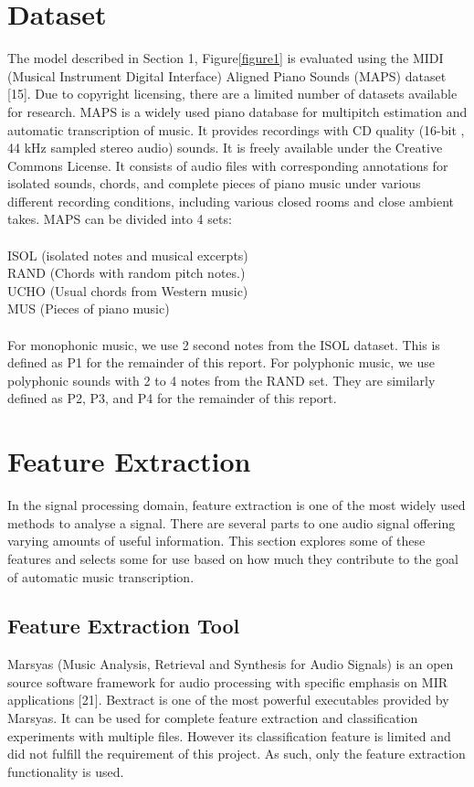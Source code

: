 \documentclass{article}
\begin{document}
 
%
\section{Dataset}\label{sec:Dataset}
The model described in Section 1, Figure\ref{figure1} is evaluated using the MIDI (Musical Instrument Digital Interface)  Aligned Piano Sounds (MAPS) dataset [15]. Due to copyright licensing, there are a limited number of datasets available for research. MAPS is a widely used piano database for multipitch estimation and automatic transcription of music. It provides recordings with CD quality (16-bit , 44 kHz sampled stereo audio) sounds. It is freely available under the Creative Commons License. It consists of audio files with corresponding annotations for isolated sounds, chords, and complete pieces of piano music under various different recording conditions, including various closed rooms and close ambient takes. MAPS can be divided into 4 sets: \\\\
ISOL (isolated notes and musical excerpts)\\
RAND (Chords with random pitch notes.)\\
UCHO (Usual chords from Western music)\\
MUS (Pieces of piano music)\\\\
For monophonic music, we use 2 second notes from the ISOL dataset. This is defined as P1 for the remainder of this report. For polyphonic music, we use polyphonic sounds with 2 to 4 notes from the RAND set. They are similarly defined as P2, P3, and P4 for the remainder of this report.
\section{Feature Extraction}\label{sec:features}
In the signal processing domain, feature extraction is one of the most widely used methods to analyse a signal. There are several parts to one audio signal offering varying amounts of useful information. This section explores some of these features and selects some for use based on how much they contribute to the goal of automatic music transcription.
\subsection{Feature Extraction Tool}
Marsyas (Music Analysis, Retrieval and Synthesis for Audio Signals) is an open source software framework for audio processing with specific emphasis on MIR applications [21]. Bextract is one of the most powerful executables provided by Marsyas. It can be used for complete feature extraction and classification experiments with multiple files. However its classification feature is limited and did not fulfill the requirement of this project. As such, only the feature extraction functionality is used.
\end{document}
